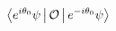 \documentclass[preview]{standalone}
\begin{document}
\begin{align*}
\Braket{e^{i \theta_0}\psi |\mathcal{O}|e^{-i \theta_0}\psi }
\end{align*}
\end{document}
